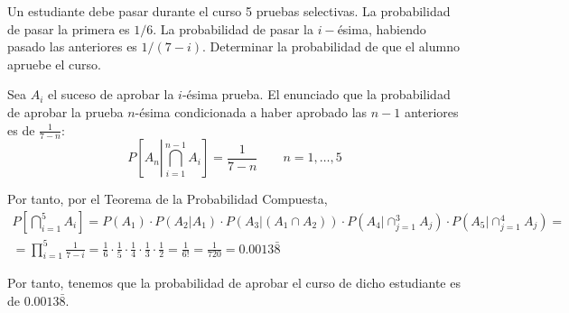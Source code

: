 \begin{ejercicio} \label{ej:4.Ejercicio2}
    Un estudiante debe pasar durante el curso 5 pruebas selectivas. La probabilidad de pasar la primera es $1/6$. La probabilidad de pasar la $i-$ésima, habiendo pasado las anteriores es $1/(7-i)$. Determinar la probabilidad de que el alumno apruebe el curso.

    Sea $A_i$ el suceso de aprobar la $i$-ésima prueba. El enunciado que la probabilidad de aprobar la prueba $n$-ésima condicionada a haber aprobado las $n-1$ anteriores es de $\frac{1}{7-n}$:
    \begin{equation*}
        P\left[A_n\left|\bigcap_{i=1}^{n-1} A_i\right.\right] = \frac{1}{7-n} \qquad n=1,\dots,5
    \end{equation*}

    Por tanto, por el Teorema de la Probabilidad Compuesta,
    \begin{multline*}
        P\left[\bigcap_{i=1}^5 A_i\right]
        = P(A_1)\cdot P(A_2|A_1) \cdot P(A_3|(A_1\cap A_2))\cdot P\left(A_4 | \cap_{j=1}^3 A_j\right)
        \cdot P\left(A_5 | \cap_{j=1}^4 A_j\right)
        =\\=
        \prod_{i=1}^5 \frac{1}{7-i}
        = \frac{1}{6} \cdot \frac{1}{5} \cdot \frac{1}{4} \cdot \frac{1}{3} \cdot\frac{1}{2} = \frac{1}{6!} = \frac{1}{720} = 0.0013\bar{8}
    \end{multline*}

    Por tanto, tenemos que la probabilidad de aprobar el curso de dicho estudiante es de $0.0013\bar{8}$.

\end{ejercicio}

